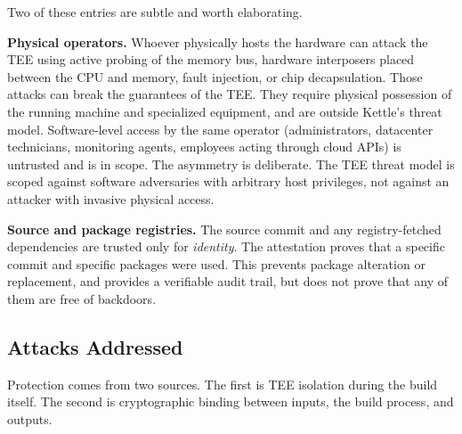 \documentclass[11pt]{article}
\begin{document}
Two of these entries are subtle and worth elaborating.

\textbf{Physical operators.} Whoever physically hosts the hardware can attack the TEE using active probing of the memory bus, hardware interposers placed between the CPU and memory, fault injection, or chip decapsulation. Those attacks can break the guarantees of the TEE. They require physical possession of the running machine and specialized equipment, and are outside Kettle's threat model. Software-level access by the same operator (administrators, datacenter technicians, monitoring agents, employees acting through cloud APIs) is untrusted and is in scope. The asymmetry is deliberate. The TEE threat model is scoped against software adversaries with arbitrary host privileges, not against an attacker with invasive physical access.

\textbf{Source and package registries.} The source commit and any registry-fetched dependencies are trusted only for \emph{identity}. The attestation proves that a specific commit and specific packages were used. This prevents package alteration or replacement, and provides a verifiable audit trail, but does not prove that any of them are free of backdoors.

\subsection{Attacks Addressed}

Protection comes from two sources. The first is TEE isolation during the build itself. The second is cryptographic binding between inputs, the build process, and outputs.
\end{document}
